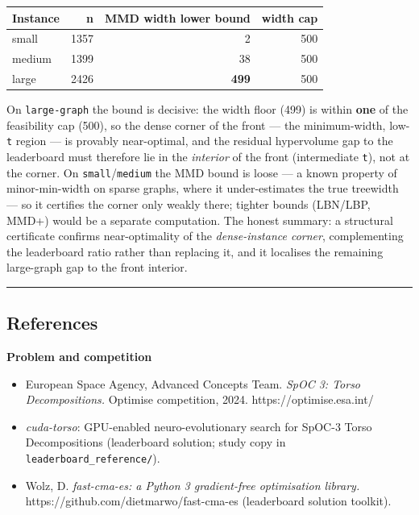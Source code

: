 \documentclass[
  11pt,
]{article}
\providecommand{\tightlist}{%
  \setlength{\itemsep}{0pt}\setlength{\parskip}{0pt}}
\begin{document}
\begin{longtable}[]{@{}lrrr@{}}
\toprule
Instance & n & MMD width lower bound & width cap\tabularnewline
\midrule
\endhead
small & 1357 & 2 & 500\tabularnewline
medium & 1399 & 38 & 500\tabularnewline
large & 2426 & \textbf{499} & 500\tabularnewline
\bottomrule
\end{longtable}

On \texttt{large-graph} the bound is decisive: the width floor (499) is
within \textbf{one} of the feasibility cap (500), so the dense corner of
the front --- the minimum-width, low-\texttt{t} region --- is provably
near-optimal, and the residual hypervolume gap to the leaderboard must
therefore lie in the \emph{interior} of the front (intermediate
\texttt{t}), not at the corner. On \texttt{small}/\texttt{medium} the
MMD bound is loose --- a known property of minor-min-width on sparse
graphs, where it under-estimates the true treewidth --- so it certifies
the corner only weakly there; tighter bounds (LBN/LBP, MMD+) would be a
separate computation. The honest summary: a structural certificate
confirms near-optimality of the \emph{dense-instance corner},
complementing the leaderboard ratio rather than replacing it, and it
localises the remaining large-graph gap to the front interior.

\begin{center}\rule{0.5\linewidth}{0.5pt}\end{center}

\hypertarget{references}{%
\subsection{References}\label{references}}

\textbf{Problem and competition}

\begin{itemize}
\tightlist
\item
  European Space Agency, Advanced Concepts Team. \emph{SpOC 3: Torso
  Decompositions.} Optimise competition, 2024. https://optimise.esa.int/
\item
  \emph{cuda-torso}: GPU-enabled neuro-evolutionary search for SpOC-3
  Torso Decompositions (leaderboard solution; study copy in
  \texttt{leaderboard\_reference/}).
\item
  Wolz, D. \emph{fast-cma-es: a Python 3 gradient-free optimisation
  library.} https://github.com/dietmarwo/fast-cma-es (leaderboard
  solution toolkit).
\end{itemize}
\end{document}
